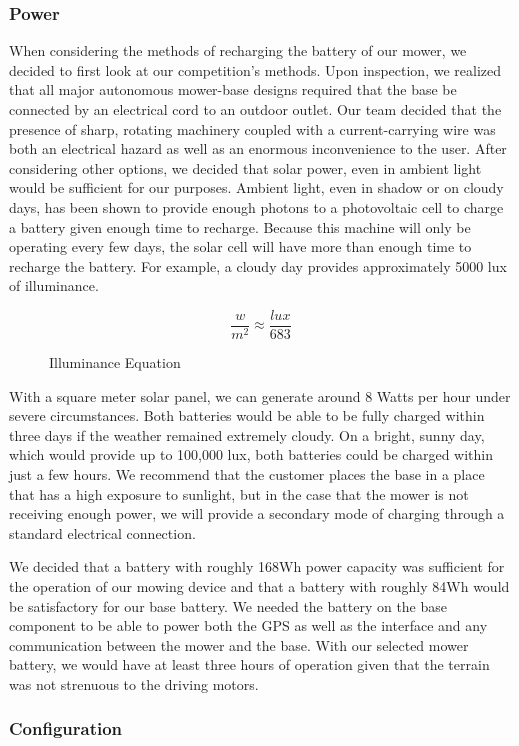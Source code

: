 \documentclass[11pt,letterpaper]{article}
\begin{document}
\subsubsection{Power}
When considering the methods of recharging the battery of our mower, we decided to first look at our competition's methods. Upon inspection, we realized that all major autonomous mower-base designs required that the base be connected by an electrical cord to an outdoor outlet. Our team decided that the presence of sharp, rotating machinery coupled with a current-carrying wire was both an electrical hazard as well as an enormous inconvenience to the user. After considering other options, we decided that solar power, even in ambient light would be sufficient for our purposes.\autocite{radiometry} Ambient light, even in shadow or on cloudy days, has been shown to provide enough photons to a photovoltaic cell to charge a battery given enough time to recharge. Because this machine will only be operating every few days, the solar cell will have more than enough time to recharge the battery. For example, a cloudy day provides approximately 5000 lux of illuminance.
 
\begin{figure}[h!]
\[
	\dfrac{w}{m^2} \approx \dfrac{lux}{683}
\]
\caption{Illuminance Equation}
\end{figure}

With a square meter solar panel, we can generate around 8 Watts per hour under severe circumstances. Both batteries would be able to be fully charged within three days if the weather remained extremely cloudy. On a bright, sunny day, which would provide up to 100,000 lux, both batteries could be charged within just a few hours. We recommend that the customer places the base in a place that has a high exposure to sunlight, but in the case that the mower is not receiving enough power, we will provide a secondary mode of charging through a standard electrical connection.

We decided that a battery with roughly 168Wh power capacity was sufficient for the operation of our mowing device and that a battery with roughly 84Wh would be satisfactory for our base battery. We needed the battery on the base component to be able to power both the GPS as well as the interface and any communication between the mower and the base. With our selected mower battery, we would have at least three hours of operation given that the terrain was not strenuous to the driving motors. 

\subsubsection{Configuration}
\end{document}

